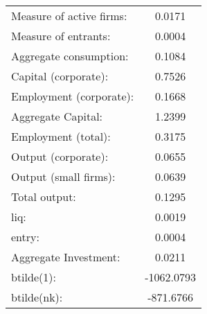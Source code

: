  \begin{tabular}{lc} \hline \hline 
 \hline 
Measure of active firms:   &    0.0171  \\ 
Measure of entrants:       &    0.0004  \\ 
Aggregate consumption:     &    0.1084  \\ 
Capital (corporate):       &    0.7526  \\ 
Employment (corporate):    &    0.1668  \\ 
Aggregate Capital:         &    1.2399  \\ 
Employment (total):        &    0.3175  \\ 
Output (corporate):        &    0.0655  \\ 
Output (small firms):      &    0.0639  \\ 
Total output:              &    0.1295  \\ 
liq:                       &    0.0019  \\ 
entry:                     &    0.0004  \\ 
Aggregate Investment:      &    0.0211  \\ 
btilde(1):                 &  -1062.0793  \\ 
btilde(nk):                &  -871.6766  \\ 
\hline \hline 
 \end{tabular} 
